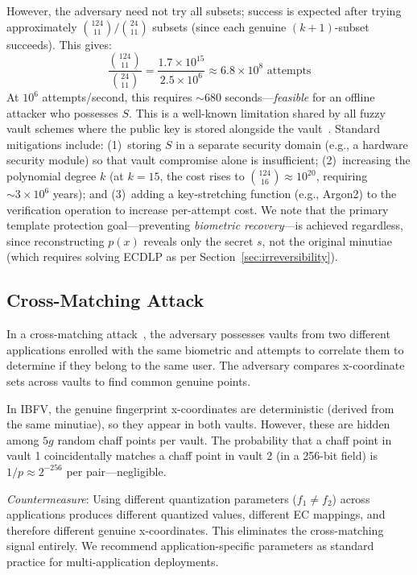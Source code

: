 \documentclass[3p,twocolumn]{elsarticle}
\newcommand{\IBFV}{\textsf{IBFV}}
\begin{document}
However, the adversary need not try all subsets; success is expected after trying approximately $\binom{124}{11} / \binom{24}{11}$ subsets (since each genuine $(k+1)$-subset succeeds). This gives:
\begin{equation}
    \frac{\binom{124}{11}}{\binom{24}{11}} = \frac{1.7 \times 10^{15}}{2.5 \times 10^{6}} \approx 6.8 \times 10^{8} \text{ attempts}
\end{equation}
At $10^6$ attempts/second, this requires $\sim\!680$ seconds---\emph{feasible} for an offline attacker who possesses $S$. This is a well-known limitation shared by all fuzzy vault schemes where the public key is stored alongside the vault~\cite{tams2013attacks,nandakumar2007fuzzy}. Standard mitigations include: (1)~storing $S$ in a separate security domain (e.g., a hardware security module) so that vault compromise alone is insufficient; (2)~increasing the polynomial degree $k$ (at $k = 15$, the cost rises to $\binom{124}{16} \approx 10^{20}$, requiring $\sim\!3 \times 10^{6}$ years); and (3)~adding a key-stretching function (e.g., Argon2) to the verification operation to increase per-attempt cost. We note that the primary template protection goal---preventing \emph{biometric recovery}---is achieved regardless, since reconstructing $p(x)$ reveals only the secret $s$, not the original minutiae (which requires solving ECDLP as per Section~\ref{sec:irreversibility}).

\subsection{Cross-Matching Attack}
\label{sec:cross_matching}

In a cross-matching attack~\cite{tams2013attacks}, the adversary possesses vaults from two different applications enrolled with the same biometric and attempts to correlate them to determine if they belong to the same user. The adversary compares x-coordinate sets across vaults to find common genuine points.

In \IBFV{}, the genuine fingerprint x-coordinates are deterministic (derived from the same minutiae), so they appear in both vaults. However, these are hidden among $5g$ random chaff points per vault. The probability that a chaff point in vault 1 coincidentally matches a chaff point in vault 2 (in a 256-bit field) is $1/p \approx 2^{-256}$ per pair---negligible.

\emph{Countermeasure}: Using different quantization parameters ($f_1 \neq f_2$) across applications produces different quantized values, different EC mappings, and therefore different genuine x-coordinates. This eliminates the cross-matching signal entirely. We recommend application-specific parameters as standard practice for multi-application deployments.
\end{document}
